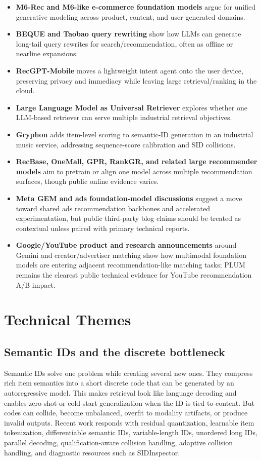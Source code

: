 \documentclass[11pt]{article}
\begin{document}
\begin{itemize}
  \item \textbf{M6-Rec and M6-like e-commerce foundation models} argue for unified generative modeling across product, content, and user-generated domains.
  \item \textbf{BEQUE and Taobao query rewriting} show how LLMs can generate long-tail query rewrites for search/recommendation, often as offline or nearline expansions.
  \item \textbf{RecGPT-Mobile} moves a lightweight intent agent onto the user device, preserving privacy and immediacy while leaving large retrieval/ranking in the cloud.
  \item \textbf{Large Language Model as Universal Retriever} explores whether one LLM-based retriever can serve multiple industrial retrieval objectives.
  \item \textbf{Gryphon} adds item-level scoring to semantic-ID generation in an industrial music service, addressing sequence-score calibration and SID collisions.
  \item \textbf{RecBase, OneMall, GPR, RankGR, and related large recommender models} aim to pretrain or align one model across multiple recommendation surfaces, though public online evidence varies.
  \item \textbf{Meta GEM and ads foundation-model discussions} suggest a move toward shared ads recommendation backbones and accelerated experimentation, but public third-party blog claims should be treated as contextual unless paired with primary technical reports.
  \item \textbf{Google/YouTube product and research announcements} around Gemini and creator/advertiser matching show how multimodal foundation models are entering adjacent recommendation-like matching tasks; PLUM remains the clearest public technical evidence for YouTube recommendation A/B impact.
\end{itemize}

\section{Technical Themes}

\subsection{Semantic IDs and the discrete bottleneck}

Semantic IDs solve one problem while creating several new ones. They compress rich item semantics into a short discrete code that can be generated by an autoregressive model. This makes retrieval look like language decoding and enables zero-shot or cold-start generalization when the ID is tied to content. But codes can collide, become unbalanced, overfit to modality artifacts, or produce invalid outputs. Recent work responds with residual quantization, learnable item tokenization, differentiable semantic IDs, variable-length IDs, unordered long IDs, parallel decoding, qualification-aware collision handling, adaptive collision handling, and diagnostic resources such as SIDInspector.
\end{document}
